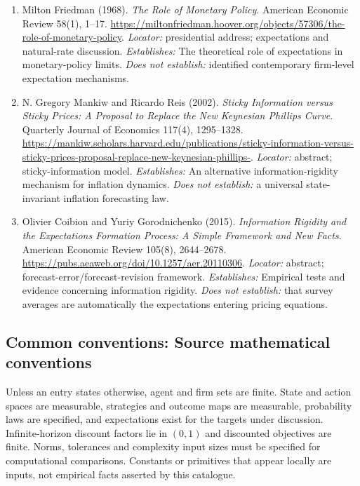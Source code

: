 \documentclass[11pt,a4paper]{article}
\begin{document}
\begin{enumerate}

\item[S1] Milton Friedman (1968). \emph{The Role of Monetary Policy}. American Economic Review 58(1), 1--17. \url{https://miltonfriedman.hoover.org/objects/57306/the-role-of-monetary-policy}. \textit{Locator:} presidential address; expectations and natural-rate discussion. \textit{Establishes:} The theoretical role of expectations in monetary-policy limits. \textit{Does not establish:} identified contemporary firm-level expectation mechanisms.

\item[S2] N. Gregory Mankiw and Ricardo Reis (2002). \emph{Sticky Information versus Sticky Prices: A Proposal to Replace the New Keynesian Phillips Curve}. Quarterly Journal of Economics 117(4), 1295--1328. \url{https://mankiw.scholars.harvard.edu/publications/sticky-information-versus-sticky-prices-proposal-replace-new-keynesian-phillips-}. \textit{Locator:} abstract; sticky-information model. \textit{Establishes:} An alternative information-rigidity mechanism for inflation dynamics. \textit{Does not establish:} a universal state-invariant inflation forecasting law.

\item[S3] Olivier Coibion and Yuriy Gorodnichenko (2015). \emph{Information Rigidity and the Expectations Formation Process: A Simple Framework and New Facts}. American Economic Review 105(8), 2644--2678. \url{https://pubs.aeaweb.org/doi/10.1257/aer.20110306}. \textit{Locator:} abstract; forecast-error/forecast-revision framework. \textit{Establishes:} Empirical tests and evidence concerning information rigidity. \textit{Does not establish:} that survey averages are automatically the expectations entering pricing equations.

\end{enumerate}

\subsection*{Common conventions: Source mathematical conventions}

Unless an entry states otherwise, agent and firm sets are finite. State and action spaces are measurable, strategies and outcome maps are measurable, probability laws are specified, and expectations exist for the targets under discussion. Infinite-horizon discount factors lie in $(0,1)$ and discounted objectives are finite. Norms, tolerances and complexity input sizes must be specified for computational comparisons. Constants or primitives that appear locally are inputs, not empirical facts asserted by this catalogue.
\end{document}
